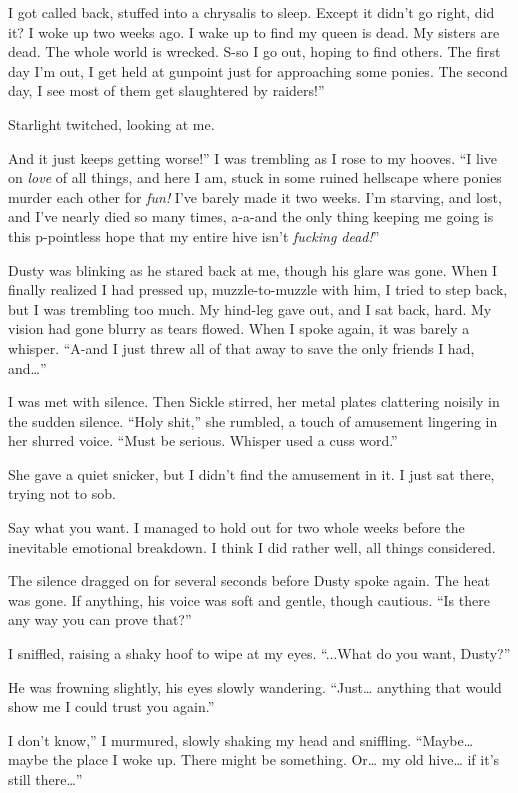 \leavevmode{}I got called back, stuffed into a chrysalis to sleep. Except it didn’t go right, did it? I woke up two weeks ago. I wake up to find my queen is dead. My sisters are dead. The whole world is wrecked. S-so I go out, hoping to find others. The first day I’m out, I get held at gunpoint just for approaching some ponies. The second day, I see most of them get slaughtered by raiders!”

Starlight twitched, looking at me.

\leavevmode{}And it just keeps getting worse!” I was trembling as I rose to my hooves. “I live on \textit{love} of all things, and here I am, stuck in some ruined hellscape where ponies murder each other for \textit{fun!} I’ve barely made it two weeks. I’m starving, and lost, and I’ve nearly died so many times, a-a-and the only thing keeping me going is this p-pointless hope that my entire hive isn’t \textit{fucking dead!}”

Dusty was blinking as he stared back at me, though his glare was gone. When I finally realized I had pressed up, muzzle-to-muzzle with him, I tried to step back, but I was trembling too much. My hind-leg gave out, and I sat back, hard. My vision had gone blurry as tears flowed. When I spoke again, it was barely a whisper. “A-and I just threw all of that away to save the only friends I had, and…”

I was met with silence. Then Sickle stirred, her metal plates clattering noisily in the sudden silence. “Holy shit,” she rumbled, a touch of amusement lingering in her slurred voice. “Must be serious. Whisper used a cuss word.”

She gave a quiet snicker, but I didn’t find the amusement in it. I just sat there, trying not to sob.

Say what you want. I managed to hold out for two whole weeks before the inevitable emotional breakdown. I think I did rather well, all things considered.

The silence dragged on for several seconds before Dusty spoke again. The heat was gone. If anything, his voice was soft and gentle, though cautious. “Is there any way you can prove that?”

I sniffled, raising a shaky hoof to wipe at my eyes. “...What do you want, Dusty?”

He was frowning slightly, his eyes slowly wandering. “Just… anything that would show me I could trust you again.”

\leavevmode{}I don’t know,” I murmured, slowly shaking my head and sniffling. “Maybe… maybe the place I woke up. There might be something. Or… my old hive… if it’s still there…”

